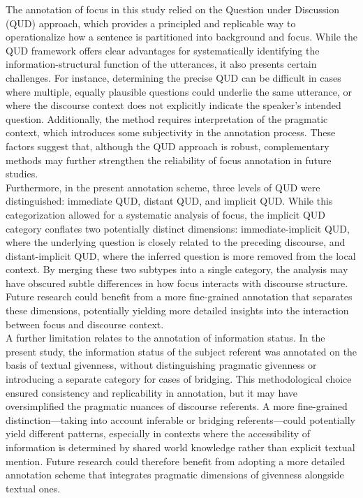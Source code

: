 The annotation of focus in this study relied on the Question under Discussion (QUD) approach, which provides a principled and replicable way to operationalize how a sentence is partitioned into background and focus. While the QUD framework offers clear advantages for systematically identifying the information-structural function of the utterances, it also presents certain challenges. For instance, determining the precise QUD can be difficult in cases where multiple, equally plausible questions could underlie the same utterance, or where the discourse context does not explicitly indicate the speaker's intended question. Additionally, the method requires interpretation of the pragmatic context, which introduces some subjectivity in the annotation process. These factors suggest that, although the QUD approach is robust, complementary methods may further strengthen the reliability of focus annotation in future studies.\\
Furthermore, in the present annotation scheme, three levels of QUD were distinguished: immediate QUD, distant QUD, and implicit QUD. While this categorization allowed for a systematic analysis of focus, the implicit QUD category conflates two potentially distinct dimensions: immediate-implicit QUD, where the underlying question is closely related to the preceding discourse, and distant-implicit QUD, where the inferred question is more removed from the local context. By merging these two subtypes into a single category, the analysis may have obscured subtle differences in how focus interacts with discourse structure. Future research could benefit from a more fine-grained annotation that separates these dimensions, potentially yielding more detailed insights into the interaction between focus and discourse context.\\
A further limitation relates to the annotation of information status. In the present study, the information status of the subject referent was annotated on the basis of textual givenness, without distinguishing pragmatic givenness or introducing a separate category for cases of bridging. This methodological choice ensured consistency and replicability in annotation, but it may have oversimplified the pragmatic nuances of discourse referents. A more fine-grained distinction—taking into account inferable or bridging referents—could potentially yield different patterns, especially in contexts where the accessibility of information is determined by shared world knowledge rather than explicit textual mention. Future research could therefore benefit from adopting a more detailed annotation scheme that integrates pragmatic dimensions of givenness alongside textual ones.\\
